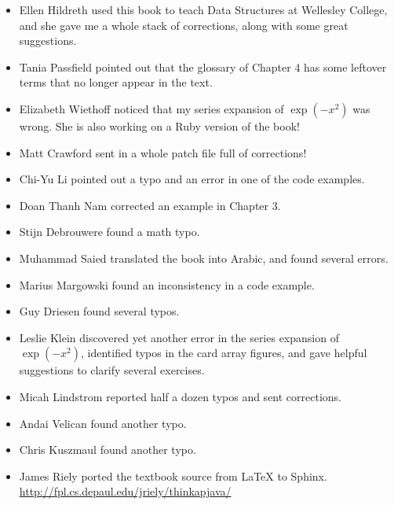 \documentclass[12pt]{book}
\theoremstyle{exercise}
\begin{document}
\begin{itemize}

\item Ellen Hildreth used this book to teach Data Structures at
Wellesley College, and she gave me a whole stack of corrections,
along with some great suggestions.

\item Tania Passfield pointed out that the glossary of Chapter 4
has some leftover terms that no longer appear in the text.

\item Elizabeth Wiethoff noticed that my series expansion of
$\exp(-x^2)$ was wrong.  She is also working on a Ruby version of
the book!

\item Matt Crawford sent in a whole patch file full of corrections!

\item Chi-Yu Li pointed out a typo and an error in one of the code
examples.

\item Doan Thanh Nam corrected an example in Chapter 3.

\item Stijn Debrouwere found a math typo.

\item Muhammad Saied translated the book into Arabic, and found
several errors.

\item Marius Margowski found an inconsistency in a code example.

\item Guy Driesen found several typos.

\item Leslie Klein discovered yet another error in the series expansion
of $\exp(-x^2)$, identified typos in the card array figures, and gave
helpful suggestions to clarify several exercises.

\item Micah Lindstrom reported half a dozen typos and sent corrections.

\item Andai Velican found another typo.

\item Chris Kuszmaul found another typo.

\item James Riely ported the textbook source from LaTeX to Sphinx.
\url{http://fpl.cs.depaul.edu/jriely/thinkapjava/}


\end{itemize}
\end{document}
